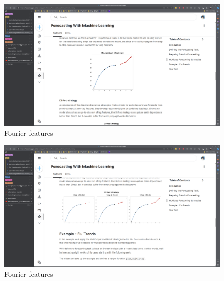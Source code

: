 \documentclass[12pt]{report}
\begin{document}
\begin{figure}[htbp]
  \begin{center}
    \includegraphics[trim =30cm 10.0cm 20cm 15cm, clip, scale=0.4]{pics/forecast3.png}
    \caption{Fourier features}
    \label{default}
  \end{center}
\end{figure}

\begin{figure}[htbp]
  \begin{center}
    \includegraphics[trim =30cm 10.0cm 20cm 15cm, clip, scale=0.4]{pics/forecast4.png}
    \caption{Fourier features}
    \label{default}
  \end{center}
\end{figure}


%


\end{document}
